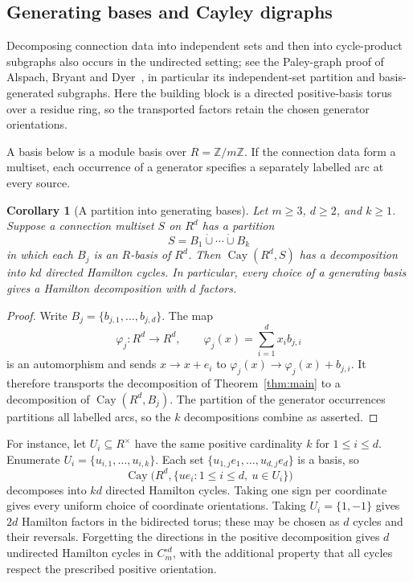\documentclass[11pt,reqno]{amsart}
\numberwithin{equation}{section}
\newtheorem{corollary}[theorem]{Corollary}
\theoremstyle{definition}
\theoremstyle{remark}
\newcommand{\Z}{\mathbb Z}
\newcommand{\Cay}{\operatorname{Cay}}
\begin{document}
\subsection{Generating bases and Cayley digraphs}
Decomposing connection data into independent sets and then into
cycle-product subgraphs also occurs in the undirected setting; see the
Paley-graph proof of Alspach, Bryant and Dyer~\cite{ABD12}, in particular
its independent-set partition and basis-generated subgraphs. Here the
building block is a directed positive-basis torus over a residue ring,
so the transported factors retain the chosen generator orientations.

A basis below is a module basis over $R=\Z/m\Z$. If the connection data form a
multiset, each occurrence of a generator specifies a separately labelled arc
at every source.

\begin{corollary}[A partition into generating bases]\label{cor:basis-partition}
Let $m\ge3$, $d\ge2$, and $k\ge1$. Suppose a connection multiset $S$ on
$R^d$ has a partition
\[
 S=B_1\mathbin{\dot\cup}\cdots\mathbin{\dot\cup}B_k
\]
in which each $B_j$ is an $R$-basis of $R^d$. Then $\Cay(R^d,S)$ has a
decomposition into $kd$ directed Hamilton cycles. In particular, every choice
of a generating basis gives a Hamilton decomposition with $d$ factors.
\end{corollary}
\begin{proof}
Write $B_j=\{b_{j,1},\ldots,b_{j,d}\}$. The map
\[
 \varphi_j:R^d\longrightarrow R^d,\qquad
 \varphi_j(x)=\sum_{i=1}^{d}x_i b_{j,i}
\]
is an automorphism and sends $x\to x+e_i$ to
$\varphi_j(x)\to\varphi_j(x)+b_{j,i}$. It therefore transports the
decomposition of Theorem~\ref{thm:main} to a decomposition of
$\Cay(R^d,B_j)$. The partition of the generator occurrences partitions all
labelled arcs, so the $k$ decompositions combine as asserted.
\end{proof}

For instance, let $U_i\subseteq R^\times$ have the same positive cardinality
$k$ for $1\le i\le d$. Enumerate $U_i=\{u_{i,1},\ldots,u_{i,k}\}$. Each set
$\{u_{1,j}e_1,\ldots,u_{d,j}e_d\}$ is a basis, so
\[
 \Cay\bigl(R^d,\{u e_i:1\le i\le d,\ u\in U_i\}\bigr)
\]
decomposes into $kd$ directed Hamilton cycles. Taking one sign per coordinate
gives every uniform choice of coordinate orientations. Taking
$U_i=\{1,-1\}$ gives $2d$ Hamilton factors in the bidirected torus; these may
be chosen as $d$ cycles and their reversals. Forgetting the directions in the
positive decomposition gives $d$ undirected Hamilton cycles in
$C_m^{\square d}$, with the additional property that all cycles respect the
prescribed positive orientation.
\end{document}
